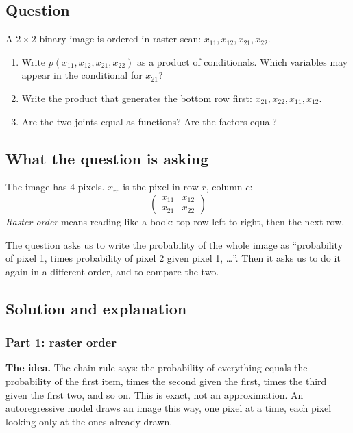 \documentclass[12pt,a4paper]{article}
\begin{document}
\subsection{Question}

A $2 \times 2$ binary image is ordered in raster scan: $x_{11}, x_{12}, x_{21}, x_{22}$.

\begin{enumerate}[leftmargin=*]
\item Write $p(x_{11}, x_{12}, x_{21}, x_{22})$ as a product of conditionals. Which variables may appear in the conditional for $x_{21}$?
\item Write the product that generates the bottom row first: $x_{21}, x_{22}, x_{11}, x_{12}$.
\item Are the two joints equal as functions? Are the factors equal?
\end{enumerate}

\subsection{What the question is asking}

The image has 4 pixels. $x_{rc}$ is the pixel in row $r$, column $c$:
\[
\begin{pmatrix} x_{11} & x_{12} \\ x_{21} & x_{22} \end{pmatrix}
\]
\emph{Raster order} means reading like a book: top row left to right, then the next row.

The question asks us to write the probability of the whole image as ``probability of pixel 1, times probability of pixel 2 given pixel 1, \ldots''. Then it asks us to do it again in a different order, and to compare the two.

\subsection{Solution and explanation}

\subsubsection{Part 1: raster order}

\textbf{The idea.} The chain rule says: the probability of everything equals the probability of the first item, times the second given the first, times the third given the first two, and so on. This is exact, not an approximation. An autoregressive model draws an image this way, one pixel at a time, each pixel looking only at the ones already drawn.
\end{document}
